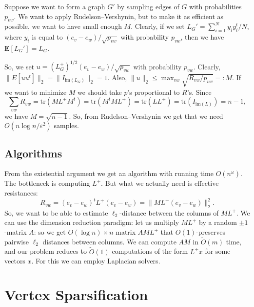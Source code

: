 \documentclass[12pt]{article}
\newcommand{\eps}{\varepsilon}
\begin{document}
    Suppose we want to form a graph $G'$ by sampling edges of $G$ with probabilities
    $p_{vw}$.
    We want to apply Rudelson--Vershynin, but to make it as efficient as possible, we want
    to have small enough $M$.
    Clearly, if we set $L_G' = \sum_{i=1}^N y_i y_i^t / N$, where $y_i$ is equal to
    $(e_v - e_w) / \sqrt{p_{vw}}$ with probability $p_{vw}$, then we have
    $\mathbf{E}[L_G'] = L_G$.

    So, we set $u = (L_G^+)^{1/2} (e_v - e_w) / \sqrt{p_{vw}}$ with probability $p_{vw}$.
    Clearly, $\|E[uu^t]\|_2 = \|I_{\mathrm{im}(L_G)}\|_2 = 1$. Also,
    $\|u\|_2 \leq \max_{vw} \sqrt{R_{vw} / p_{vw}} =: M$.
    If we want to minimize $M$ we should take $p$'s proportional to $R$'s.
    Since
    $$
        \sum_{vw} R_{vw} = \mathrm{tr}(ML^+M^t) = \mathrm{tr}(M^tML^+) =
        \mathrm{tr}(LL^+) = \mathrm{tr}(I_{\mathrm{im}(L)}) = n - 1,
    $$
    we have $M = \sqrt{n - 1}$. So, from Rudelson--Vershynin we get that we need
    $O(n \log n / \eps^2)$ samples.

    \subsection{Algorithms}

    From the existential argument we get an algorithm with running time $O(n^{\omega})$.
    The bottleneck is computing $L^+$.
    But what we actually need is effective resistances:
    $$
        R_{vw} = (e_v - e_w)^t L^+ (e_v - e_w) = \|ML^+ (e_v - e_w)\|_2^2.
    $$
    So, we want to be able to estimate $\ell_2$-distance between the columns of
    $ML^+$. We can use the dimension reduction paradigm: let us multiply $ML^+$ by
    a random $\pm 1$-matrix $A$: so we get $O(\log n) \times n$ matrix $AML^+$ that
    $O(1)$-preserves pairwise $\ell_2$ distances between columns.
    We can compute $AM$ in $\tilde{O}(m)$ time, and our problem reduces to $\tilde{O}(1)$
    computations of the form $L^+ x$ for some vectors $x$. For this we can employ
    Laplacian solvers.

    \section{Vertex Sparsification}
    
    
\end{document}
